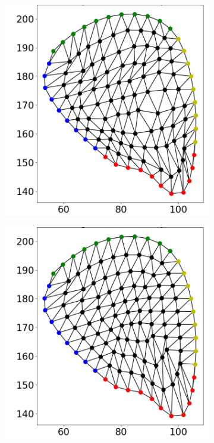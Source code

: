 \begin{figure}
\begin{subfigure}[t]{0.24\textwidth}
    \label{fig:tri_03}%
  \end{subfigure}
  \begin{subfigure}[t]{0.24\textwidth}%
    \centering%
    \includegraphics[width=\textwidth, trim=30mm 14mm 6mm 6mm, clip]{images/fiber_creation/mesh_plots/out_1_3_0_w.png}%
    \label{fig:tri_13}%
  \end{subfigure}
  \begin{subfigure}[t]{0.24\textwidth}%
    \centering%
    \includegraphics[width=\textwidth, trim=30mm 14mm 6mm 6mm, clip]{images/fiber_creation/mesh_plots/out_2_3_0_w.png}%

\end{subfigure}
\end{figure}
